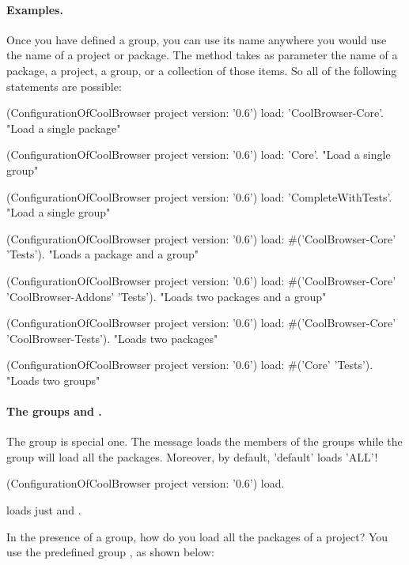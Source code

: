 \documentclass[a4paper,10pt,twoside]{book}
\begin{document}
 

\paragraph{Examples.} Once you have defined a group, you can use its name anywhere you would use the name of a project or package. The   method takes as parameter the name of a package, a project, a group, or a collection of those items.  So all of the following statements are possible:

 
\begin{code}{}
(ConfigurationOfCoolBrowser project version: '0.6') load: 'CoolBrowser-Core'. 
       "Load a single package"

(ConfigurationOfCoolBrowser project version: '0.6') load: 'Core'. 
       "Load a single group"

(ConfigurationOfCoolBrowser project version: '0.6') load: 'CompleteWithTests'.  
       "Load a single group"
 
(ConfigurationOfCoolBrowser project version: '0.6') 
       load: #('CoolBrowser-Core' 'Tests').    
       "Loads a package and a group"

(ConfigurationOfCoolBrowser project version: '0.6') 
       load: #('CoolBrowser-Core' 'CoolBrowser-Addons' 'Tests'). 
       "Loads two packages and a group" 

(ConfigurationOfCoolBrowser project version: '0.6') 
       load: #('CoolBrowser-Core' 'CoolBrowser-Tests').
       "Loads two packages"
  
(ConfigurationOfCoolBrowser project version: '0.6') load: #('Core' 'Tests'). 
       "Loads two groups"
\end{code}


\paragraph{The groups  and .} 
The  group is special one.  The  message loads the members of the  groups while the group  
will load all the packages. Moreover, by default, 'default' loads 'ALL'!

    
\begin{code}{}
(ConfigurationOfCoolBrowser project version: '0.6') load.
\end{code}

\noindent
loads just  and .

In the presence of a  group, how do you load all the packages of a project?  You use the predefined group  , as shown below: 
\end{document}
